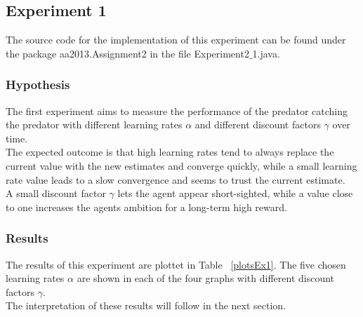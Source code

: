\documentclass[11pt]{article}
\begin{document}

\subsection{Experiment 1}

The source code for the implementation of this experiment can be found under the package aa2013.Assignment2 in the file Experiment2$\_$1.java.
\subsubsection{Hypothesis}
The first experiment aims to measure the performance of the predator catching the predator with different learning rates $\alpha$ and different discount factors $\gamma$ over time.\\
The expected outcome is that high learning rates tend to always replace the current value with the new estimates and converge quickly, while a small learning rate value leads to a slow convergence and seems to trust the current estimate. ~\cite{dar}\\
A small discount factor $\gamma$ lets the agent appear short-sighted, while a value close to one increases the agents ambition for a long-term high reward.

\subsubsection{Results}
The results of this experiment are plottet in Table ~\ref{plotsEx1}. The five chosen learning rates $\alpha$ are shown in each of the four graphs with different discount factors $\gamma$.\\
The interpretation of these results will follow in the next section.
\end{document}
